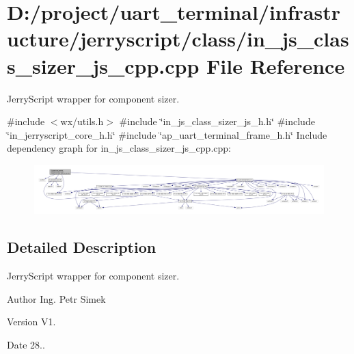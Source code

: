 \section{D\+:/project/uart\+\_\+terminal/infrastructure/jerryscript/class/in\+\_\+js\+\_\+class\+\_\+sizer\+\_\+js\+\_\+cpp.cpp File Reference}
\label{in__js__class__sizer__js__cpp_8cpp}


Jerry\+Script wrapper for component sizer.  


{\ttfamily \#include $<$wx/utils.\+h$>$}\newline
{\ttfamily \#include \char`\"{}in\+\_\+js\+\_\+class\+\_\+sizer\+\_\+js\+\_\+h.\+h\char`\"{}}\newline
{\ttfamily \#include \char`\"{}in\+\_\+jerryscript\+\_\+core\+\_\+h.\+h\char`\"{}}\newline
{\ttfamily \#include \char`\"{}ap\+\_\+uart\+\_\+terminal\+\_\+frame\+\_\+h.\+h\char`\"{}}\newline
Include dependency graph for in\+\_\+js\+\_\+class\+\_\+sizer\+\_\+js\+\_\+cpp.\+cpp\+:\nopagebreak
\begin{figure}[H]
\begin{center}
\leavevmode
\includegraphics[width=350pt]{in__js__class__sizer__js__cpp_8cpp__incl}
\end{center}
\end{figure}


\subsection{Detailed Description}
Jerry\+Script wrapper for component sizer. 

\begin{DoxyAuthor}{Author}
Ing. Petr Simek 
\end{DoxyAuthor}
\begin{DoxyVersion}{Version}
V1. 
\end{DoxyVersion}
\begin{DoxyDate}{Date}
28.. 
\end{DoxyDate}

